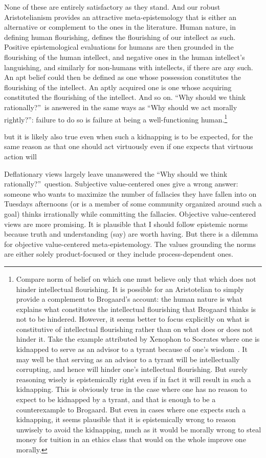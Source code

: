 None of these are entirely satisfactory as they stand. And our robust Aristotelianism provides an attractive meta-epistemology that
is either an alternative or complement to the ones in the literature.
Human nature, in defining human flourishing, defines the flourishing of our intellect as such. Positive epistemological
evaluations for humans are then grounded in the flourishing of the human intellect, and negative ones in the human intellect's languishing, and similarly for non-humans with intellects, if there are any such.
An apt belief could then be defined as one whose possession constitutes the flourishing of the intellect. 
An aptly acquired one is one whose acquiring constituted the flourishing of the intellect. And so on. ``Why should we think rationally?''\ is answered
in the same ways as ``Why should we act morally rightly?'': failure to do so is failure at being a well-functioning 
human.\footnote{Compare  norm of belief on which one must believe only that which
does not hinder intellectual flourishing. It is possible for an Aristotelian to simply provide a complement
to Brogaard's account: the human nature is what explains what constitutes the intellectual flourishing that Brogaard
thinks is not to be hindered. However, it seems better to focus explicitly on what is constitutive of intellectual
flourishing rather than on what does or does not hinder it. Take the example attributed by Xenophon to
Socrates where one is kidnapped to serve as an advisor to a tyrant because of one's 
wisdom~\parencite[\textit{Memorabilia} IV.2]{Xenophon}. It may well be that serving as an advisor to a tyrant
will be intellectually corrupting, and hence will hinder one's intellectual flourishing. But surely reasoning
wisely is epistemically right even if in fact it will result in such a kidnapping. This is obviously true
in the case where one has no reason to expect to be kidnapped by a tyrant, and that is enough to be a counterexample
to Brogaard. But even in cases where one expects such a kidnapping, it seems plausible that it is epistemically
wrong to reason unwisely to avoid the kidnapping, much as it would be morally wrong to steal money for 
tuition in an ethics class that would on the whole improve one morally.}

 but it is likely also true even
when such a kidnapping is to be expected, for the same reason as that one should act virtuously even if one
expects that virtuous action will 

Deflationary views largely leave unanswered the ``Why should we think rationally?''\ question.
Subjective value-centered ones give a wrong answer: someone who wants to maximize the number of fallacies
they have fallen into on Tuesdays afternoons (or is a member of some community organized around such a 
goal) thinks irrationally while committing the fallacies. 
Objective value-centered views are more promising. It is plausible that I should follow epistemic norms because 
truth and understanding (say) are worth having. But there is a dilemma for objective value-centered meta-epistemology.
The values grounding the norms are either solely product-focused or they include process-dependent ones. 


